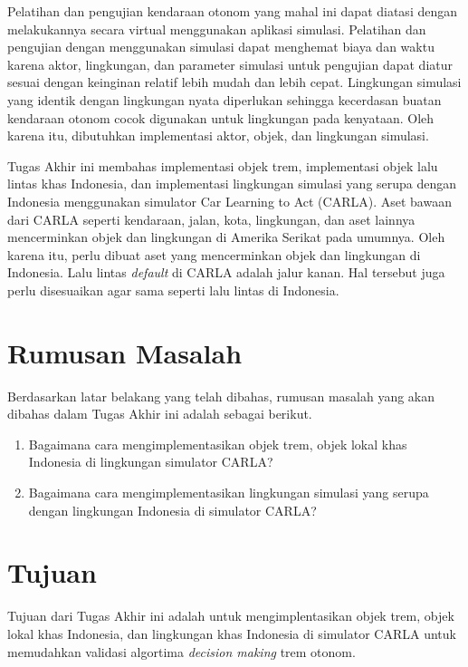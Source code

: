 Pelatihan dan pengujian kendaraan otonom yang mahal ini dapat diatasi dengan
melakukannya secara virtual menggunakan aplikasi simulasi. Pelatihan dan
pengujian dengan menggunakan simulasi dapat menghemat biaya dan waktu karena
aktor, lingkungan, dan parameter simulasi untuk pengujian dapat diatur sesuai
dengan keinginan relatif lebih mudah dan lebih cepat. Lingkungan simulasi yang
identik dengan lingkungan nyata diperlukan sehingga kecerdasan buatan kendaraan
otonom cocok digunakan untuk lingkungan pada kenyataan. Oleh karena itu,
dibutuhkan implementasi aktor, objek, dan lingkungan simulasi.

Tugas Akhir ini membahas implementasi objek trem, implementasi objek lalu lintas
khas Indonesia, dan implementasi lingkungan simulasi yang serupa dengan
Indonesia menggunakan simulator Car Learning to Act (CARLA). Aset bawaan dari
CARLA seperti kendaraan, jalan, kota, lingkungan, dan aset lainnya mencerminkan
objek dan lingkungan di Amerika Serikat pada umumnya. Oleh karena itu, perlu
dibuat aset yang mencerminkan objek dan lingkungan di Indonesia. Lalu lintas
\textit{default} di CARLA adalah jalur kanan. Hal tersebut juga perlu
disesuaikan agar sama seperti lalu lintas di Indonesia.

\section{Rumusan Masalah}

Berdasarkan latar belakang yang telah dibahas, rumusan masalah yang akan dibahas
dalam Tugas Akhir ini adalah sebagai berikut.

\begin{enumerate}

	\item Bagaimana cara mengimplementasikan objek trem, objek lokal khas
	Indonesia di lingkungan simulator CARLA?

	\item Bagaimana cara mengimplementasikan lingkungan simulasi yang serupa
	dengan lingkungan Indonesia di simulator CARLA?

\end{enumerate}

\section{Tujuan}

Tujuan dari Tugas Akhir ini adalah untuk mengimplentasikan objek trem, objek
lokal khas Indonesia, dan lingkungan khas Indonesia di simulator CARLA untuk
memudahkan validasi algortima \textit{decision making} trem otonom.

